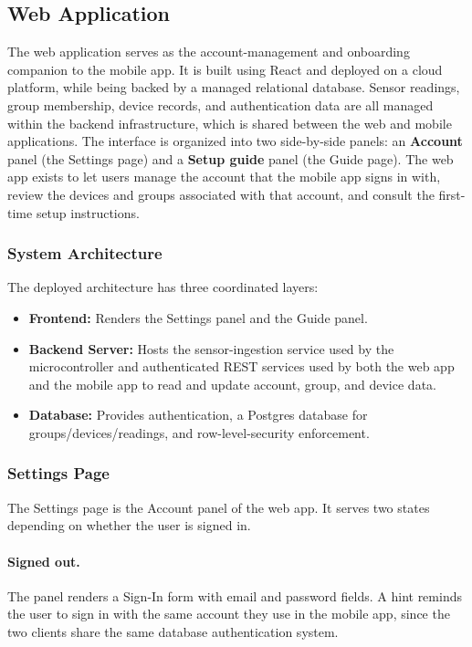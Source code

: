 \subsection{Web Application}

The web application serves as the account-management and onboarding companion to the mobile app. 
It is built using React and deployed on a cloud platform, while being backed by a managed relational database. 
Sensor readings, group membership, device records, and authentication data are all managed within the backend infrastructure, 
which is shared between the web and mobile applications. The interface is organized into two side-by-side panels: 
an \textbf{Account} panel (the Settings page) and a \textbf{Setup guide} panel (the Guide page). The web app exists to let users manage the 
account that the mobile app signs in with, review the devices and groups associated with that account, and consult the first-time setup instructions.

\subsubsection{System Architecture}
The deployed architecture has three coordinated layers:

\begin{itemize}
    \item \textbf{Frontend:} Renders the Settings panel and the Guide panel.
    \item \textbf{Backend Server:} Hosts the sensor-ingestion service used by the microcontroller and authenticated REST services used by both the web app and the mobile app to read and update account, group, and device data.
    \item \textbf{Database:} Provides authentication, a Postgres database for groups/devices/readings, and row-level-security enforcement.
\end{itemize}

\subsubsection{Settings Page}
The Settings page is the Account panel of the web app. It serves two states depending on whether the user is signed in.

\paragraph{Signed out.}
The panel renders a Sign-In form with email and password fields. A hint reminds the user to sign in with the same account they use in the mobile app, since the two clients share the same database authentication system.


